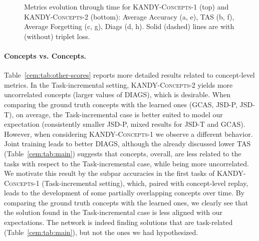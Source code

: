 \begin{figure}
\begin{subfigure}{.24\textwidth}
\caption{}
\end{subfigure}
\caption[Performance over time on \textsc{KANDY-Concepts}]{Metrics evolution through time for \textsc{KANDY-Concepts-1} (top) and \textsc{KANDY-Concepts-2} (bottom): {\small\sc Average Accuracy} (a, e), {\small\sc TAS} (b, f), {\small\sc Average Forgetting} (c, g), {\small\sc Diags} (d, h). Solid (dashed) lines are with (without) triplet loss.
}
\label{cem:fig:kandytime}
\end{figure}

\paragraph{Concepts vs. Concepts.} Table~\ref{cem:tab:other-scores} reports more detailed results related to concept-level metrics. 
In the Task-incremental setting, \textsc{KANDY-Concepts-2} yields more uncorrelated concepts (larger values of {\small\sc DIAGS}), which is desirable. When comparing the ground truth concepts with the learned ones ({\small\sc GCAS}, {\small\sc JSD-P}, {\small\sc JSD-T}), on average, the Task-incremental case is better suited to model our expectation (consistently smaller {\small\sc JSD-P}, mixed results for {\small\sc JSD-T} and {\small\sc GCAS}). However, when considering \textsc{KANDY-Concepts-1} we observe a different behavior. Joint training leads to better {\small\sc DIAGS}, although the already discussed lower {\small\sc TAS} (Table~\ref{cem:tab:main}) suggests that concepts, overall, are less related to the tasks with respect to the Task-incremental case, while being more uncorrelated. We motivate this result by the subpar accuracies in the first tasks of \textsc{KANDY-Concepts-1} (Task-incremental setting), which, paired with concept-level replay, leads to the development of some partially overlapping concepts over time. By comparing the ground truth concepts with the learned ones, we clearly see that the solution found in the Task-incremental case is less aligned with our expectations. The network is indeed finding solutions that are task-related (Table~\ref{cem:tab:main}), but not the ones we had hypothesized. 
